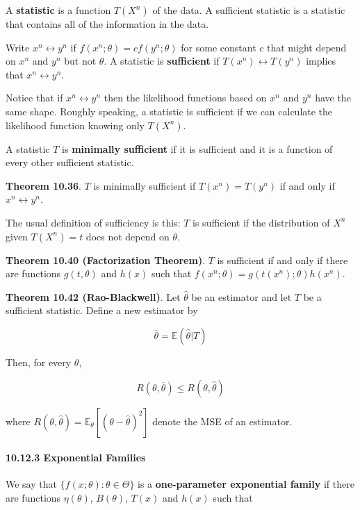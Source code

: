 A \textbf{statistic} is a function \(T(X^{n})\) of the data. A sufficient
statistic is a statistic that contains all of the information in the
data.

Write \(x^{n} \leftrightarrow y^{n}\) if
\(f(x^{n}; \theta) = c f(y^{n}; \theta)\) for some constant \(c\) that might
depend on \(x^{n}\) and \(y^{n}\) but not \(\theta\). A statistic is
\textbf{sufficient} if \(T(x^{n}) \leftrightarrow T(y^{n})\) implies that
\(x^{n} \leftrightarrow y^{n}\).

Notice that if \(x^{n} \leftrightarrow y^{n}\) then the likelihood functions
based on \(x^{n}\) and \(y^{n}\) have the same shape. Roughly speaking, a
statistic is sufficient if we can calculate the likelihood function
knowing only \(T(X^{n})\).

A statistic \(T\) is \textbf{minimally sufficient} if it is sufficient
and it is a function of every other sufficient statistic.

\textbf{Theorem 10.36}. \(T\) is minimally sufficient if
\(T(x^{n}) = T(y^{n})\) if and only if \(x^{n} \leftrightarrow y^{n}\).

The usual definition of sufficiency is this: \(T\) is sufficient if the
distribution of \(X^{n}\) given \(T(X^{n}) = t\) does not depend on
\(\theta\).

\textbf{Theorem 10.40 (Factorization Theorem)}. \(T\) is sufficient if
and only if there are functions \(g(t, \theta)\) and \(h(x)\) such that
\(f(x^{n}; \theta) = g(t(x^{n}); \theta)h(x^{n})\).

\textbf{Theorem 10.42 (Rao-Blackwell)}. Let \(\hat{\theta}\) be an
estimator and let \(T\) be a sufficient statistic. Define a new
estimator by

\[\overline{\theta} = \mathbb{E}(\hat{\theta} | T)\]

Then, for every \(\theta\),

\[R(\theta, \overline{\theta}) \leq R(\theta, \hat{\theta})\]

where
\(R(\theta, \hat{\theta}) = \mathbb{E}_\theta[(\theta - \hat{\theta})^{2}]\)
denote the MSE of an estimator.

\paragraph{10.12.3 Exponential Families}\label{exponential-families}

We say that \(\{f(x; \theta) : \theta \in \Theta\}\) is a
\textbf{one-parameter exponential family} if there are functions
\(\eta(\theta)\), \(B(\theta)\), \(T(x)\) and \(h(x)\) such that

